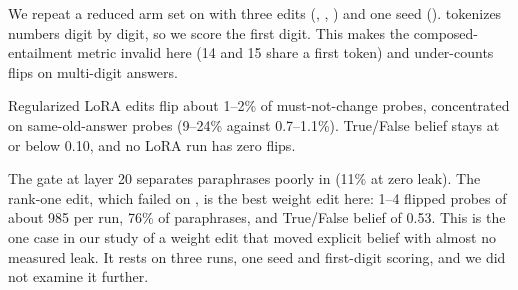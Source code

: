 We repeat a reduced arm set on \qwen with three edits (, , ) and one seed ().
\qwenshort tokenizes numbers digit by digit, so we score the first digit.
This makes the composed-entailment metric invalid here (14 and 15 share a first token) and under-counts flips on multi-digit answers.

Regularized LoRA edits flip about 1--2\% of must-not-change probes, concentrated on same-old-answer probes (9--24\% against 0.7--1.1\%).
True/False belief stays at or below 0.10, and no LoRA run has zero flips.

The gate at layer 20 separates paraphrases poorly in \qwenshort (11\% at zero leak).
The rank-one edit, which failed on \llamashort, is the best weight edit here: 1--4 flipped probes of about 985 per run, 76\% of paraphrases, and True/False belief of 0.53.
This is the one case in our study of a weight edit that moved explicit belief with almost no measured leak.
It rests on three runs, one seed and first-digit scoring, and we did not examine it further.
